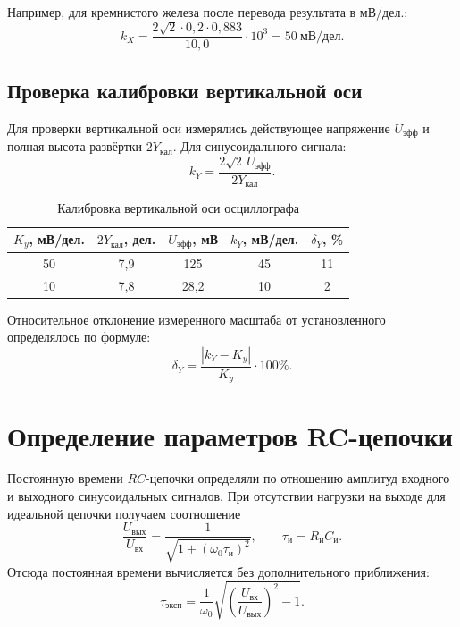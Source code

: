 \documentclass[12pt,a4paper]{article}
\begin{document}
Например, для кремнистого железа после перевода результата в мВ/дел.:
\[
 k_X=\frac{2\sqrt{2}\cdot 0{,}2\cdot 0{,}883}{10{,}0}
 \cdot 10^3=50\ \text{мВ/дел.}
\]

\subsection{Проверка калибровки вертикальной оси}

Для проверки вертикальной оси измерялись действующее
напряжение $U_{\text{эфф}}$ и полная высота развёртки
$2Y_{\text{кал}}$. Для синусоидального сигнала:
\begin{equation}
 k_Y=\frac{2\sqrt{2}\,U_{\text{эфф}}}{2Y_{\text{кал}}}.
 \label{eq:ky_cal}
\end{equation}

\begin{table}[H]
 \centering
 \caption{Калибровка вертикальной оси осциллографа}
 \label{tab:cal_y}
 \small
 \setlength{\tabcolsep}{5pt}
 \begin{tabular}{|c|c|c|c|c|}
 \hline
 $K_y$, мВ/дел. & $2Y_{\text{кал}}$, дел. &
 $U_{\text{эфф}}$, мВ & $k_Y$, мВ/дел. &
 $\delta_Y$, \% \\
 \hline
 50 & 7,9 & 125 & 45 & 11 \\
 \hline
 10 & 7,8 & 28,2 & 10 & 2 \\
 \hline
 \end{tabular}
\end{table}

Относительное отклонение измеренного масштаба
от установленного определялось по формуле:
\begin{equation}
 \delta_Y=\frac{|k_Y-K_y|}{K_y}\cdot100\%.
 \label{eq:dy_cal}
\end{equation}

\section{Определение параметров RC-цепочки}

Постоянную времени $RC$-цепочки определяли по отношению
амплитуд входного и выходного синусоидальных сигналов.
При отсутствии нагрузки на выходе для идеальной цепочки
получаем соотношение
\begin{equation}
 \frac{U_{\text{вых}}}{U_{\text{вх}}}
 =\frac{1}{\sqrt{1+(\omega_0\tau_{\text{и}})^2}},
 \qquad \tau_{\text{и}}=R_{\text{и}}C_{\text{и}}.
 \label{eq:rc_ratio}
\end{equation}
Отсюда постоянная времени вычисляется без дополнительного
приближения:
\begin{equation}
 \tau_{\text{эксп}}=\frac{1}{\omega_0}
 \sqrt{\left(\frac{U_{\text{вх}}}{U_{\text{вых}}}\right)^2-1}.
 \label{eq:tau_exact}
\end{equation}
\end{document}
